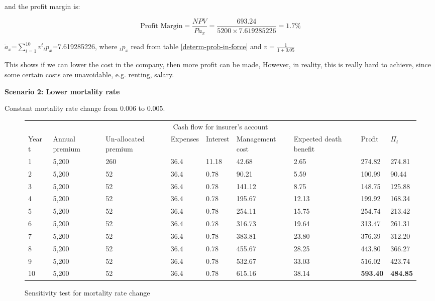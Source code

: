 \documentclass{report}
\begin{document}
and the profit margin is:

\[
\text{Profit Margin} =  \frac{NPV}{P \ddot{a}_x}= \frac{693.24 }{5200 \times 7.619285226} = 1.7\%
\]

$\ddot{a}_x$=$\sum_{i=1}^{10} v^t {_tp_x}$=7.619285226, where $_tp_x$ read from table \ref{determ-prob-in-force} and $v=\frac{1}{1+0.05}$ 

This shows if we can lower the cost in the company, then more profit can be made, However, in reality, this is really hard to achieve, since some certain costs are unavoidable, e.g. renting, salary.




\textbf{Scenario 2: Lower mortality rate} 

Constant mortality rate change from 0.006 to 0.005.



\begin{figure}[H]
\hfill
    \centering
\begin{tabular}{p{0.8cm} p{1.5cm} p{1.5cm} p{1.2cm} p{1cm} p{2cm}p{1.5cm} p{1.5cm} p{1.5cm} }
\toprule
\multicolumn{9}{c}{Cash flow for insurer's account} \\
\cmidrule(r){3-7}

Year t & Annual premium & Un-allocated premium & Expenses & Interest &Management cost& Expected death benefit & Profit& $\Pi_t$  \\
\midrule

1&5,200&260&36.4&11.18&42.68&2.65&274.82&274.81\\
2&5,200&52&36.4&0.78&90.21&5.59&100.99&90.44\\
3&5,200&52&36.4&0.78&141.12&8.75&148.75&125.88\\
4&5,200&52&36.4&0.78&195.67&12.13&199.92&168.34\\
5&5,200&52&36.4&0.78&254.11&15.75&254.74&213.42\\
6&5,200&52&36.4&0.78&316.73&19.64&313.47&261.31\\
7&5,200&52&36.4&0.78&383.81&23.80&376.39&312.20\\
8&5,200&52&36.4&0.78&455.67&28.25&443.80&366.27\\
9&5,200&52&36.4&0.78&532.67&33.03&516.02&423.74\\
10&5,200&52&36.4&0.78&615.16&38.14&\textbf{593.40}&\textbf{484.85}\\

\bottomrule
\end{tabular}
\caption{Sensitivity test for mortality rate change}
\label{determ-sensi-morta}
\end{figure}
\end{document}
